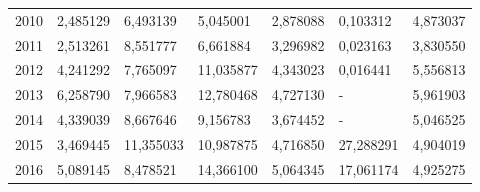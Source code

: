 \begin{table}
\begin{tabular}{p{1cm}p{2cm}p{2cm}p{2cm}p{2cm}p{2cm}p{2cm}}
 2010 &      2,485129 &                                           6,493139 &         5,045001 &                  2,878088 &                               0,103312 & 4,873037 \\
 2011 &      2,513261 &                                           8,551777 &         6,661884 &                  3,296982 &                               0,023163 & 3,830550 \\
 2012 &      4,241292 &                                           7,765097 &        11,035877 &                  4,343023 &                               0,016441 & 5,556813 \\
 2013 &      6,258790 &                                           7,966583 &        12,780468 &                  4,727130 &                                      - & 5,961903 \\
 2014 &      4,339039 &                                           8,667646 &         9,156783 &                  3,674452 &                                      - & 5,046525 \\
 2015 &      3,469445 &                                          11,355033 &        10,987875 &                  4,716850 &                              27,288291 & 4,904019 \\
 2016 &      5,089145 &                                           8,478521 &        14,366100 &                  5,064345 &                              17,061174 & 4,925275 \\
\bottomrule
\end{tabular}
\end{table}
